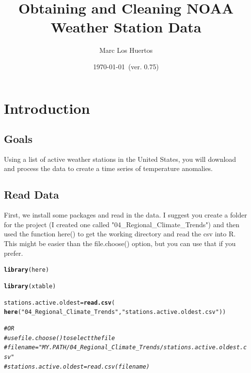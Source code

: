 \documentclass{article}\usepackage[]{graphicx}\usepackage[]{xcolor}
\title{Obtaining and Cleaning NOAA Weather Station Data}
\author{Marc Los Huertos}
\date{\today~(ver. 0.75)}
\makeatletter
\newcommand{\hlstr}[1]{\textcolor[rgb]{0.192,0.494,0.8}{#1}}%
\newcommand{\hlcom}[1]{\textcolor[rgb]{0.678,0.584,0.686}{\textit{#1}}}%
\newcommand{\hlstd}[1]{\textcolor[rgb]{0.345,0.345,0.345}{#1}}%
\newcommand{\hlkwb}[1]{\textcolor[rgb]{0.69,0.353,0.396}{#1}}%
\newcommand{\hlkwd}[1]{\textcolor[rgb]{0.737,0.353,0.396}{\textbf{#1}}}%
\newenvironment{kframe}{%
 \def\at@end@of@kframe{}%
 \ifinner\ifhmode%
  \def\at@end@of@kframe{\end{minipage}}%
  \begin{minipage}{\columnwidth}%
 \fi\fi%
 \def\FrameCommand##1{\hskip\@totalleftmargin \hskip-\fboxsep
 \colorbox{shadecolor}{##1}\hskip-\fboxsep
     \hskip-\linewidth \hskip-\@totalleftmargin \hskip\columnwidth}%
 \MakeFramed {\advance\hsize-\width
   \@totalleftmargin\z@ \linewidth\hsize
   \@setminipage}}%
 {\par\unskip\endMakeFramed%
 \at@end@of@kframe}
\newenvironment{knitrout}{}{} %
\makeatother
\begin{document}
\maketitle

\section{Introduction}

\subsection{Goals}

Using a list of active weather stations in the United States, you  will download and process the data to create a time series of temperature anomalies. 

\subsection{Read Data}

First, we install some packages and read in the data. I suggest you create a folder for the project (I created one called "04\_Regional\_Climate\_Trends") and then used the function here() to get the working directory and read the csv into R. This might be easier than the file.choose() option, but you can use that if you prefer.

\begin{knitrout}
\color{fgcolor}\begin{kframe}
\begin{alltt}
\hlkwd{library}\hlstd{(here)}
\end{alltt}


{\ttfamily\noindent\itshape\color{messagecolor}{\#\# here() starts at /home/mwl04747/RTricks}}\begin{alltt}
\hlkwd{library}\hlstd{(xtable)}

\hlstd{stations.active.oldest} \hlkwb{=} \hlkwd{read.csv}\hlstd{(}
  \hlkwd{here}\hlstd{(}\hlstr{"04_Regional_Climate_Trends"}\hlstd{,} \hlstr{"stations.active.oldest.csv"}\hlstd{))}

\hlcom{# OR}
\hlcom{# use file.choose() to select the file}
\hlcom{# filename = "MY.PATH/04_Regional_Climate_Trends/stations.active.oldest.csv"}
\hlcom{# stations.active.oldest = read.csv(filename)}
\end{alltt}
\end{kframe}
\end{knitrout}
\end{document}

